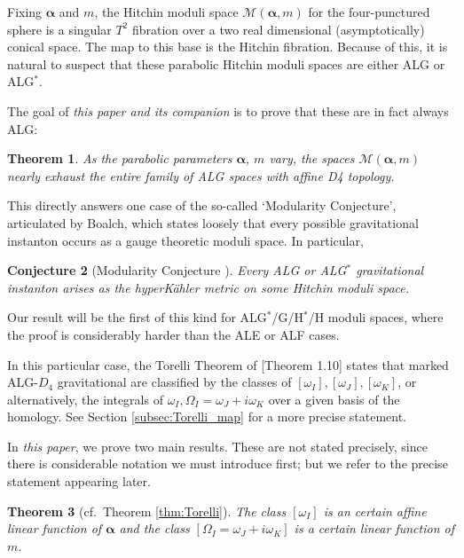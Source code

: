 \documentclass[12pt,letterpaper,reqno]{amsart}
\def\mathbf#1{#1}%
\newtheorem{thm}{Theorem}
\newtheorem{conj}[thm]{Conjecture}
\theoremstyle{remark}
\theoremstyle{definition}
\numberwithin{thm}{section}
\numberwithin{equation}{section}
\numberwithin{figure}{section}
\newcommand{\cMam}{\mathcal{M}(\boldsymbol{\alpha}, \mathbf{m})}
\begin{document}
Fixing $\boldsymbol{\alpha}$ and $\mathbf{m}$, the Hitchin moduli space $\cMam$ for the four-punctured sphere is a singular $T^2$ fibration over a two real 
dimensional (asymptotically) conical space.  The map to this base is the Hitchin fibration. Because of this, it is natural to suspect that these parabolic 
Hitchin moduli spaces are either ALG or ALG${}^*$. 

The goal of \emph{this paper and its companion} is to prove that these are in fact always ALG:
\begin{thm} \label{thm:mainofboth}
As the parabolic parameters $\boldsymbol{\alpha}$, $\mathbf{m}$ vary, the spaces $\cMam$ nearly exhaust the entire family of ALG spaces with affine D4 
topology. 
\end{thm}  
This directly answers one case of the so-called `Modularity Conjecture', articulated by Boalch, 
which states loosely that every possible 
gravitational instanton occurs as a gauge theoretic moduli space.  In particular, 
\begin{conj}[Modularity Conjecture \cite{aim}]
Every ALG or ALG$^*$ gravitational instanton arises as the hyperK\"ahler metric on some Hitchin moduli space.
\end{conj}
Our result will be the first of this kind for ALG${}^*$/G/H${}^*$/H moduli spaces, where the proof is considerably harder than the ALE or ALF cases.

\bigskip

In this particular case, the Torelli Theorem of \cite{CVZ2024}[Theorem 1.10]  states that marked ALG-$D_4$ gravitational are classified by the classes of $[\omega_I], [\omega_J], [\omega_K]$, or alternatively, the integrals of $\omega_I, \Omega_I = \omega_J+ i \omega_K$ over a given basis of the homology.  See Section \ref{subsec:Torelli_map} for a more precise statement.
 
 \bigskip
 
 In \emph{this paper}, we prove two main results. These are not stated precisely, since there is considerable notation we must introduce first; but we refer to the precise statement appearing later.


 \begin{thm}[cf.\, Theorem \ref{thm:Torelli}] The class $[\omega_I]$ is an certain affine linear function of $\boldsymbol{\alpha}$ and the class $[\Omega_I = \omega_J + i \omega_K]$ is a certain linear function of $\mathbf{m}$.
 \end{thm}
 
\end{document}
